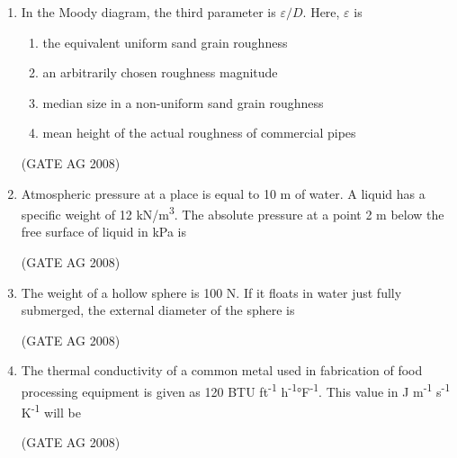 \documentclass[journal]{IEEEtran}
\begin{document}
\begin{enumerate}
\medskip

\item 
 In the Moody diagram, the third parameter is $\varepsilon/D$. Here, $\varepsilon$ is
\begin{enumerate}
\item the equivalent uniform sand grain roughness
\item an arbitrarily chosen roughness magnitude
\item median size in a non-uniform sand grain roughness
\item mean height of the actual roughness of commercial pipes
\end{enumerate}
\hfill(GATE AG 2008)\\

\medskip

\item 
 Atmospheric pressure at a place is equal to 10 m of water. A liquid has a specific weight of 12 kN/m\textsuperscript{3}. The absolute pressure at a point 2 m below the free surface of liquid in kPa is
\begin{enumerate}
\end{enumerate}
\hfill(GATE AG 2008)\\

\medskip

\item 
 The weight of a hollow sphere is 100 N. If it floats in water just fully submerged, the external diameter of the sphere is
\begin{enumerate}
\end{enumerate}
\hfill(GATE AG 2008)\\

\medskip

\item 
 The thermal conductivity of a common metal used in fabrication of food processing equipment is given as 120 BTU ft\textsuperscript{-1} h\textsuperscript{-1}°F\textsuperscript{-1}. This value in J m\textsuperscript{-1} s\textsuperscript{-1} K\textsuperscript{-1} will be
\begin{enumerate}
\end{enumerate}
\hfill(GATE AG 2008)\\


\end{enumerate}
\end{document}
